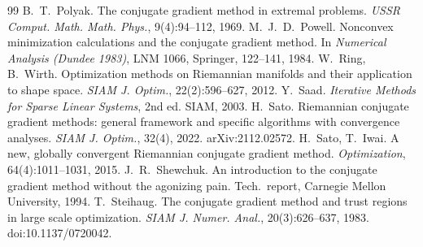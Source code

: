 \documentclass[11pt,a4paper]{article}
\theoremstyle{remark}
\begin{document}
\begin{thebibliography}{99}
 B.~T.~Polyak. The conjugate gradient method in extremal problems. \emph{USSR Comput. Math. Math. Phys.}, 9(4):94--112, 1969.
 M.~J.~D.~Powell. Nonconvex minimization calculations and the conjugate gradient method. In \emph{Numerical Analysis (Dundee 1983)}, LNM 1066, Springer, 122--141, 1984.
 W.~Ring, B.~Wirth. Optimization methods on Riemannian manifolds and their application to shape space. \emph{SIAM J. Optim.}, 22(2):596--627, 2012.
 Y.~Saad. \emph{Iterative Methods for Sparse Linear Systems}, 2nd ed. SIAM, 2003.
 H.~Sato. Riemannian conjugate gradient methods: general framework and specific algorithms with convergence analyses. \emph{SIAM J. Optim.}, 32(4), 2022. arXiv:2112.02572.
 H.~Sato, T.~Iwai. A new, globally convergent Riemannian conjugate gradient method. \emph{Optimization}, 64(4):1011--1031, 2015.
 J.~R.~Shewchuk. An introduction to the conjugate gradient method without the agonizing pain. Tech.\ report, Carnegie Mellon University, 1994.
 T.~Steihaug. The conjugate gradient method and trust regions in large scale optimization. \emph{SIAM J. Numer. Anal.}, 20(3):626--637, 1983. doi:10.1137/0720042.
\end{thebibliography}
\end{document}
